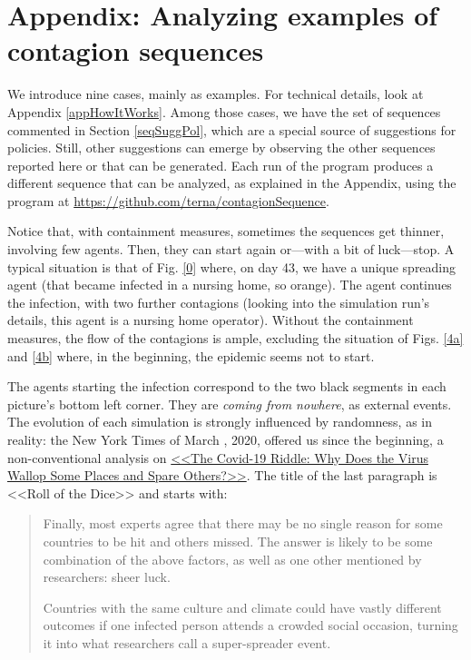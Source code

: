 \documentclass[graybox]{svmult}
\begin{document}

\section{Appendix: Analyzing examples of contagion sequences}
\label{appContagion}


We introduce nine cases, mainly as examples. For technical details, look at Appendix \ref{appHowItWorks}. Among those cases, we have the set of sequences commented in Section \ref{seqSuggPol}, which are a special source of suggestions for policies. Still, other suggestions can emerge by observing the other sequences reported here or that can be generated. Each run of the program produces a different sequence that can be analyzed, as explained in the Appendix, using the program at \url{https://github.com/terna/contagionSequence}.

Notice that, with containment measures, sometimes the sequences get thinner, involving few agents. 
Then, they can start again or---with a bit of luck---stop. A typical situation is that of Fig. \ref{0} where, on day 43, we have a unique spreading agent (that became infected in a nursing home, so orange). The agent continues the infection, with two further contagions (looking into the simulation run's details, this agent is a nursing home operator). Without the containment measures, the flow of the contagions is ample, excluding the situation of Figs. \ref{4a} and \ref{4b} where, in the beginning, the epidemic seems not to start.

The agents starting the infection correspond to the two black segments in each picture's bottom left corner. They are  \emph{coming from nowhere}, as external events. The evolution of each simulation is strongly influenced by randomness, as in reality: the New York Times of March , 2020, offered us since the beginning, a non-conventional analysis on  
\href{https://www.nytimes.com/2020/05/03/world/asia/coronavirus-spread-where-why.html}{<<The Covid-19 Riddle: Why Does the Virus Wallop Some Places and Spare Others?>>}. The title of the last paragraph is <<Roll of the Dice>> and starts with:

\begin{quote}
Finally, most experts agree that there may be no single reason for some countries to be hit and others missed. The answer is likely to be some combination of the above factors, as well as one other mentioned by researchers: sheer luck.

Countries with the same culture and climate could have vastly different outcomes if one infected person attends a crowded social occasion, turning it into what researchers call a super-spreader event.
\end{quote}
\end{document}
